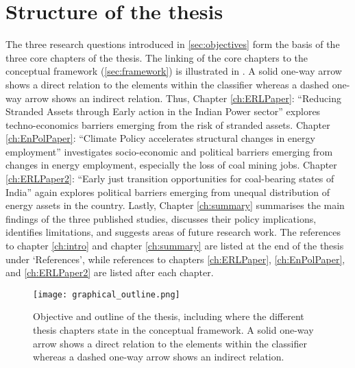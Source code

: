 \documentclass[../thesis.tex]{subfiles}
\begin{document}
\section{Structure of the thesis}
The three research questions introduced in \cref{sec:objectives} form the basis of the three core chapters of the thesis. The linking of the core chapters to the conceptual framework (\cref{sec:framework}) is illustrated in . A solid one-way arrow shows a direct relation to the elements within the classifier whereas a dashed one-way arrow shows an indirect relation. Thus, Chapter \ref{ch:ERLPaper}: ``Reducing Stranded Assets through Early action in the Indian Power sector'' explores techno-economics barriers emerging from the risk of stranded assets. Chapter \ref{ch:EnPolPaper}: ``Climate Policy accelerates structural changes in energy employment'' investigates socio-economic and political barriers emerging from changes in energy employment, especially the loss of coal mining jobs. Chapter \ref{ch:ERLPaper2}: ``Early just transition opportunities for coal-bearing states of India'' again explores political barriers emerging from unequal distribution of energy assets in the country. Lastly, Chapter \ref{ch:summary} summarises the main findings of the three published studies, discusses their policy implications, identifies limitations, and suggests areas of future research work. The references to chapter \ref{ch:intro} and chapter \ref{ch:summary} are listed at the end of the thesis under `References', while references to chapters \ref{ch:ERLPaper}, \ref{ch:EnPolPaper}, and \ref{ch:ERLPaper2} are listed  after each chapter.

\begin{figure}[hbtp]
\centering
\texttt{[image: graphical\_outline.png]}
\caption{Objective and outline of the thesis, including where the different thesis chapters state in the conceptual framework. A solid one-way arrow shows a direct relation to the elements within the classifier whereas a dashed one-way arrow shows an indirect relation.}
\label{fig:graphical_outline}
\end{figure}


\biblio
\end{document}
